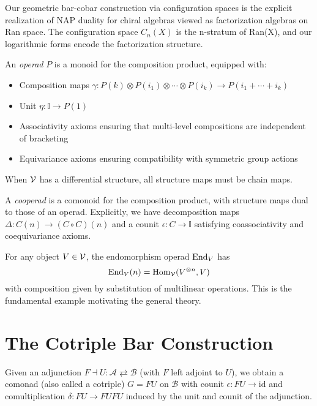 \begin{example}
Our geometric bar-cobar construction via configuration spaces is the explicit realization of NAP duality for chiral algebras viewed as factorization algebras on Ran space. The configuration space $C_n(X)$ is the n-stratum of Ran(X), and our logarithmic forms encode the factorization structure.

\begin{definition}[Operad]
An \emph{operad} $P$ is a monoid for the composition product, equipped with:
\begin{itemize}
\item Composition maps $\gamma : P(k) \otimes P(i_1) \otimes \cdots \otimes P(i_k) \to P(i_1 + \cdots + i_k)$
\item Unit $\eta : \mathbb{I} \to P(1)$ 
\item Associativity axioms ensuring that multi-level compositions are independent of bracketing
\item Equivariance axioms ensuring compatibility with symmetric group actions
\end{itemize}
When $\mathcal{V}$ has a differential structure, all structure maps must be chain maps.
\end{definition}
 
\begin{definition}[Cooperad]
A \emph{cooperad} is a comonoid for the composition product, with structure maps dual to those of an operad. Explicitly, we have decomposition maps $\Delta : C(n) \to (C \circ C)(n)$ and a counit $\epsilon : C \to \mathbb{I}$ satisfying coassociativity and coequivariance axioms.
\end{definition}
 
\begin{example}
For any object $V \in \mathcal{V}$, the endomorphism operad $\operatorname{End}_V$ has 
\[
\operatorname{End}_V(n) = \operatorname{Hom}_{\mathcal{V}}(V^{\otimes n}, V)
\]
with composition given by substitution of multilinear operations. This is the fundamental example motivating the general theory.
\end{example}
 
\section{The Cotriple Bar Construction}
 
Given an adjunction $F \dashv U : \mathcal{A} \rightleftarrows \mathcal{B}$ (with $F$ left adjoint to $U$), we obtain a comonad (also called a cotriple) $G = FU$ on $\mathcal{B}$ with counit $\epsilon : FU \to \text{id}$ and comultiplication $\delta : FU \to FUFU$ induced by the unit and counit of the adjunction.
 

\end{example}
